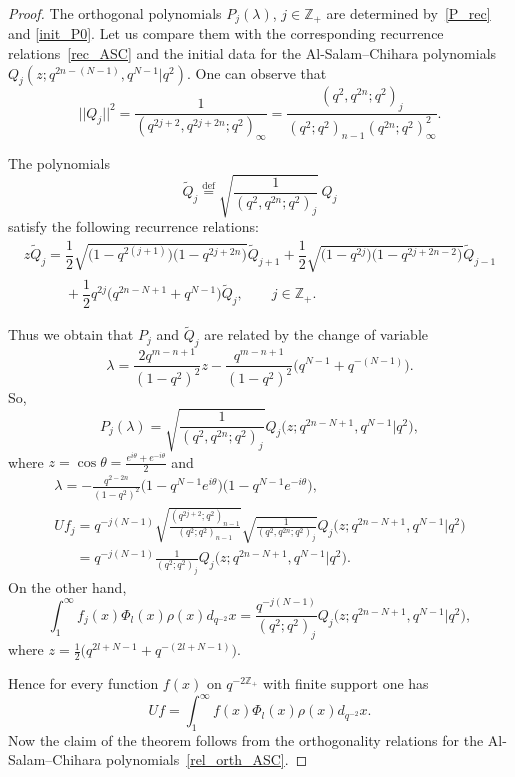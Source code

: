 \documentclass[pdftex]{sigma}
\begin{document}
\begin{proof}
The orthogonal polynomials $P_j(\lambda)$, $j\in\mathbb{Z}_+$ are determined by~\eqref{P_rec} and
\eqref{init_P0}. Let us compare them with the corresponding recurrence relations~\eqref{rec_ASC} and the
initial data for the Al-Salam--Chihara polynomials $Q_j(z;q^{2n-(N-1)},q^{N-1}|q^2)$. One can observe that
\[
||Q_j||^2=\frac{1}{(q^{2j+2},q^{2j+2n};q^2)_\infty}=\frac{(q^2,q^{2n};q^2)_j}{(q^2;q^2)_{n-1}(q^{2n};q^2)^2_\infty}.
\]

The polynomials
\[
\widetilde{Q}_j\overset{\mathrm{def}}{=}\sqrt{\frac{1}{(q^2,q^{2n};q^2)_j}} \,Q_j
\]
satisfy the following recurrence relations:
\begin{gather*}
z\widetilde{Q}_j=\dfrac12\sqrt{\big(1-q^{2(j+1)}\big)\big(1-q^{2j+2n}\big)}\widetilde{Q}_{j+1}+
\dfrac12\sqrt{\big(1-q^{2j}\big)\big(1-q^{2j+2n-2}\big)}\widetilde{Q}_{j-1}\\
\phantom{z\widetilde{Q}_j=}{} +\dfrac12q^{2j}\big(q^{2n-N+1}+q^{N-1}\big)\widetilde{Q}_j, \qquad j \in \mathbb Z_+.
\end{gather*}

Thus we obtain that $P_j$ and $\widetilde{Q}_j$ are related by the change of variable
\[
\lambda=\frac{2q^{m-n+1}}{(1-q^2)^2}z-\frac{q^{m-n+1}}{(1-q^2)^2}\big(q^{N-1}+q^{-(N-1)}\big).
\]
So,
\[
P_j(\lambda)=\sqrt{\frac{1}{(q^2,q^{2n};q^2)_j}}  Q_j\big(z;q^{2n-N+1},q^{N-1}|q^2\big),
\]
where $z=\cos \theta=\frac{e^{i\theta}+e^{-i\theta}}{2}$ and
\begin{gather*}
\lambda=-\frac{q^{2-2n}}{(1-q^2)^2}\big(1-q^{N-1}e^{i\theta}\big)\big(1-q^{N-1}e^{-i\theta}\big),\\
Uf_j=q^{-j(N-1)}\sqrt{\frac{(q^{2j+2};q^2)_{n-1}}{(q^{2};q^2)_{n-1}}}\sqrt{\frac{1}{(q^2,q^{2n};q^2)_j}}
Q_j\big(z;q^{2n-N+1},q^{N-1}|q^2\big) \\
\phantom{Uf_j}{} =q^{-j(N-1)}\frac{1}{(q^2;q^2)_j} Q_j\big(z;q^{2n-N+1},q^{N-1}|q^2\big).
\end{gather*}
On the other hand,
\[
\int_1^\infty
f_j(x)\Phi_{l}(x)\rho(x)d_{q^{-2}}x=\frac{q^{-j(N-1)}}{(q^2;q^2)_j} Q_j\big(z;q^{2n-N+1},q^{N-1}|q^2\big),
\]
where $z=\frac12\big(q^{2l+N-1}+q^{-(2l+N-1)}\big)$.

Hence for every function $f(x)$ on $q^{-2\mathbb{Z}_+}$ with f\/inite support one has
\[
Uf=\int_1^\infty f(x)\Phi_{l}(x)\rho(x)d_{q^{-2}}x.
\]
Now the claim of the theorem follows from the orthogonality relations for the Al-Salam--Chihara polynomials~\eqref{rel_orth_ASC}. \end{proof}
\end{document}
